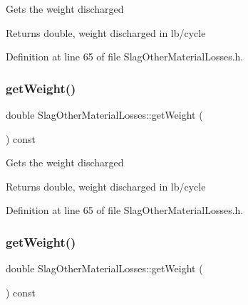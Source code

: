 Gets the weight discharged

\begin{DoxyReturn}{Returns}
double, weight discharged in lb/cycle 
\end{DoxyReturn}


Definition at line 65 of file Slag\+Other\+Material\+Losses.\+h.

\mbox{\label{class_slag_other_material_losses_a9b62b86eb4ec919d70dd8899ef5d3513}} 
\subsubsection{\texorpdfstring{get\+Weight()}{getWeight()}\hspace{0.1cm}{\footnotesize\ttfamily [2/3]}}
{\footnotesize\ttfamily double Slag\+Other\+Material\+Losses\+::get\+Weight (\begin{DoxyParamCaption}{ }\end{DoxyParamCaption}) const\hspace{0.3cm}{\ttfamily [inline]}}

Gets the weight discharged

\begin{DoxyReturn}{Returns}
double, weight discharged in lb/cycle 
\end{DoxyReturn}


Definition at line 65 of file Slag\+Other\+Material\+Losses.\+h.

\mbox{\label{class_slag_other_material_losses_a9b62b86eb4ec919d70dd8899ef5d3513}} 
\subsubsection{\texorpdfstring{get\+Weight()}{getWeight()}\hspace{0.1cm}{\footnotesize\ttfamily [3/3]}}
{\footnotesize\ttfamily double Slag\+Other\+Material\+Losses\+::get\+Weight (\begin{DoxyParamCaption}{ }\end{DoxyParamCaption}) const\hspace{0.3cm}{\ttfamily [inline]}}

